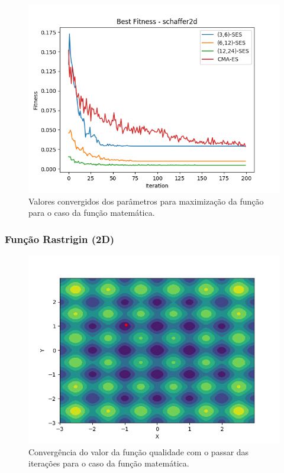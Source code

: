 \documentclass[conference]{IEEEtran}
\begin{document}
\begin{figure}[htbp]
\centering
\centerline{\includegraphics[scale=0.4]{imagens/schaffer2d/best_fitness.png}}
\caption{Valores convergidos dos parâmetros para maximização da função para o caso da função matemática.}
\label{schaffer2d/best_fitness}
\end{figure}

\subsubsection{Função Rastrigin (2D)}

\begin{figure}[htbp]
\centering
\centerline{\includegraphics[scale=0.4]{imagens/rastrigin/ses.png}}
\caption{Convergência do valor da função qualidade com o passar das iterações para o caso da função matemática.}
\label{rastrigin/ses}
\end{figure} 
\end{document}
